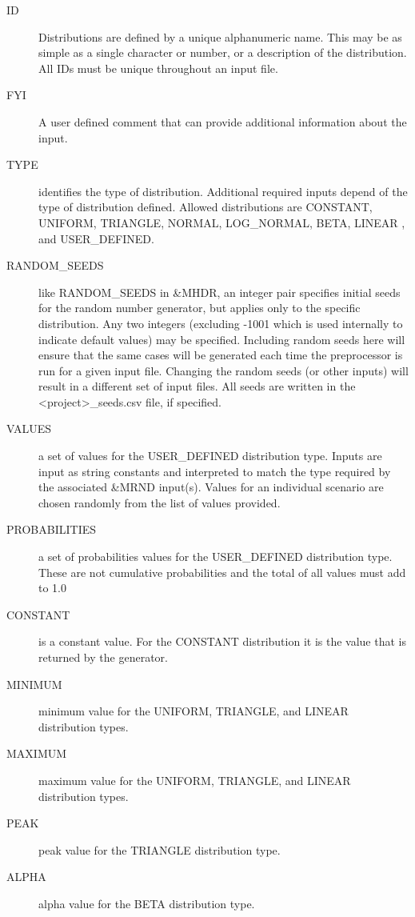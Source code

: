 \documentclass[12pt,twoside]{book}
\begin{document}
\begin{description}
  \item[ID] Distributions are defined by a unique alphanumeric name. This may be as simple as a single character or number, or a description of the distribution. All IDs must be unique throughout an input file.
  \item[FYI] A user defined comment that can provide additional information about the input.
  \item[TYPE] identifies the type of distribution. Additional required inputs depend of the type of distribution defined. Allowed distributions are {\ct CONSTANT},  {\ct UNIFORM}, {\ct TRIANGLE}, {\ct NORMAL}, {\ct LOG\_NORMAL}, {\ct BETA}, {\ct LINEAR }, and {\ct USER\_DEFINED}.
  \item[RANDOM\_SEEDS] like {\ct RANDOM\_SEEDS} in {\ct \&MHDR}, an integer pair specifies initial seeds for the random number generator, but applies only to the specific distribution. Any two integers (excluding -1001 which is used internally to indicate default values) may be specified. Including random seeds here will ensure that the same cases will be generated each time the preprocessor is run for a given input file. Changing the random seeds (or other inputs) will result in a different set of input files. All seeds are written in the {\ct <project>\_seeds.csv} file, if specified.
  \item[VALUES] a set of values for the {\ct USER\_DEFINED} distribution type. Inputs are input as string constants and interpreted to match the type required by the associated {\ct \&MRND} input(s). Values for an individual scenario are chosen randomly from the list of values provided.
  \item[PROBABILITIES] a set of probabilities values for the {\ct USER\_DEFINED} distribution type. These are not cumulative probabilities and the total of all values must add to 1.0
  \item[CONSTANT] is a constant value. For the {\ct CONSTANT} distribution it is the value that is returned by the generator.
  \item[MINIMUM] minimum value for the {\ct UNIFORM}, {\ct TRIANGLE}, and {\ct LINEAR} distribution types.
  \item[MAXIMUM] maximum value for the {\ct UNIFORM}, {\ct TRIANGLE}, and {\ct LINEAR} distribution types.
  \item[PEAK] peak value for the {\ct TRIANGLE} distribution type.
  \item[ALPHA] alpha value for the {\ct BETA} distribution type.

\end{description}
\end{document}
